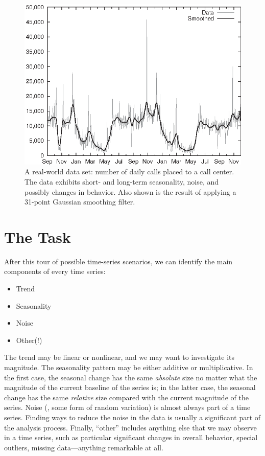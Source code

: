 \begin{figure}
  \centerline{\includegraphics{img/callcenter}}
  \caption{A real-world data set: number of daily calls placed to a
    call center.  The data exhibits short- and long-term seasonality,
    noise, and possibly changes in behavior.  Also shown is the result
    of applying a 31-point Gaussian smoothing filter.}
  \label{fig:callcenter}
\end{figure}


\section{The Task}


After this tour of possible time-series scenarios, we can identify the
main components of every time series:

\begin{itemize}
\item Trend
\item Seasonality
\item Noise
\item Other(!)
\end{itemize}

The trend may be linear or nonlinear, and we may want to investigate
its magnitude. The seasonality pattern may be either additive or
multiplicative. In the first case, the seasonal change has the same
\emph{absolute} size no matter what the magnitude of the current
baseline of the series is; in the latter case, the seasonal change has
the same \emph{relative} size compared with the current magnitude of
the series. Noise (\ie, some form of random variation) is almost
always part of a time series. Finding ways to reduce the noise in the
data is usually a significant part of the analysis process. Finally,
``other'' includes anything else that we may observe in a time series,
such as particular significant changes in overall behavior, special
outliers, missing data---anything remarkable at all.

